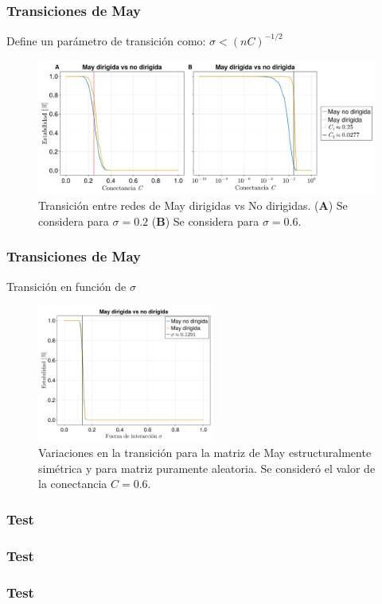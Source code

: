\documentclass[10pt]{beamer}
\begin{document}
\begin{frame}
  \frametitle{Transiciones de May}
  Define un parámetro de transición como: $\sigma<(nC)^{-1/2}$
  \begin{figure}[h!]
  	\centering
  	\includegraphics[scale = 0.10]{../Texto/Imagenes/TransicionDirvsNoDir}
  	\caption{Transición entre redes de May dirigidas vs No dirigidas. (\textbf{A}) Se considera para $\sigma = 0.2$ (\textbf{B}) Se considera para $\sigma=0.6$.}
  	\label{fig:TransicionDirvsNoDir}
  \end{figure}
\end{frame}
\begin{frame}
  \frametitle{Transiciones de May}
  Transición en función de $\sigma$
  \begin{figure}[h!]
  	\centering
	\includegraphics[width=0.52\textwidth]{../Texto/Imagenes/TransicionσDirvsNoDir} 
  	\caption{Variaciones en la transición para la matriz de May estructuralmente simétrica y para matriz puramente aleatoria. Se consideró el valor de la conectancia $C=0.6$.} 
  	\label{fig:TransicionσDirvsNoDir}
  \end{figure} 
\end{frame}
\begin{frame}
  \frametitle{Test}
\end{frame}
\begin{frame}
  \frametitle{Test}
\end{frame}
\begin{frame}
  \frametitle{Test}
\end{frame}
\end{document}
